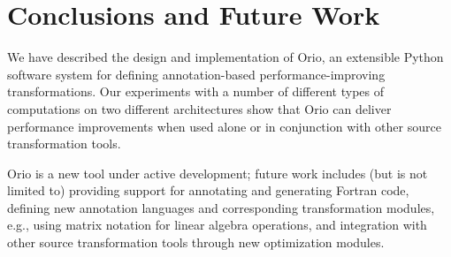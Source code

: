 \section{Conclusions and Future Work}
\label{sec:conclusions}



We have described the design and implementation of Orio, an extensible Python
software system for defining annotation-based performance-improving
transformations. Our experiments with a number of different types of
computations on two different architectures show that Orio can deliver
performance improvements when used alone or in conjunction with other source
transformation tools.

Orio is a new tool under active development; future work includes (but is not
limited to) providing support for annotating and generating Fortran code,
defining new annotation languages and corresponding transformation modules,
e.g., using matrix notation for linear algebra operations, and integration
with other source transformation tools through new optimization modules.

